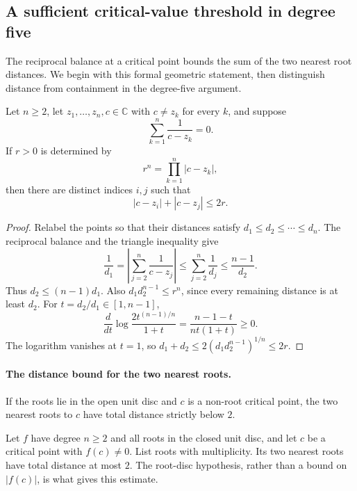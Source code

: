 \documentclass[11pt]{article}
\begin{document}
\subsection*{A sufficient critical-value threshold in degree five}

The reciprocal balance at a critical point bounds the sum of the two
nearest root distances. We begin with this formal geometric statement,
then distinguish distance from containment in the degree-five argument.

\begin{theorem}
\label{res:critical-proximity}
Let $n\ge2$, let $z_1,\ldots,z_n,c\in\mathbb C$ with $c\ne z_k$ for every
$k$, and suppose
\[
  \sum_{k=1}^n\frac1{c-z_k}=0.
\]
If $r>0$ is determined by
\[
  r^n=\prod_{k=1}^n|c-z_k|,
\]
then there are distinct indices $i,j$ such that
\[
  |c-z_i|+|c-z_j|\le2r.
\]
\end{theorem}
\begin{proof}
Relabel the points so that their distances satisfy
$d_1\le d_2\le\cdots\le d_n$. The reciprocal balance and the triangle
inequality give
\[
 \frac1{d_1}
 =\left|\sum_{j=2}^n\frac1{c-z_j}\right|
 \le\sum_{j=2}^n\frac1{d_j}\le\frac{n-1}{d_2}.
\]
Thus $d_2\le(n-1)d_1$. Also $d_1d_2^{n-1}\le r^n$, since every
remaining distance is at least $d_2$. For $t=d_2/d_1\in[1,n-1]$,
\[
 \frac{d}{dt}\log\frac{2t^{(n-1)/n}}{1+t}
       =\frac{n-1-t}{nt(1+t)}\ge0.
\]
The logarithm vanishes at $t=1$, so
$d_1+d_2\le2(d_1d_2^{n-1})^{1/n}\le2r$.
\end{proof}

\paragraph{The distance bound for the two nearest roots.}
\hypertarget{two-nearest-root-distance}{}
\begin{corollary}\label{res:two-nearest-roots}
If the roots lie in the open unit disc and $c$ is a non-root critical point,
the two nearest roots to $c$ have total distance strictly below $2$.
\end{corollary}

Let $f$ have degree $n\ge2$ and all roots in the closed unit disc, and
let $c$ be a critical point with $f(c)\ne0$. List roots with multiplicity.
Its two nearest roots have
total distance at most $2$. The root-disc hypothesis, rather than a bound
on $|f(c)|$, is what gives this estimate.
\end{document}
